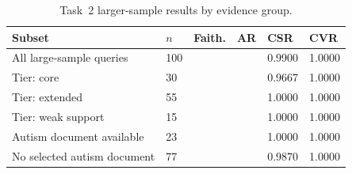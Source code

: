 \begin{table}
\centering
\small
\caption{Task~2 larger-sample results by evidence group.}
\label{tab:task2-group-robustness}
\setlength{\tabcolsep}{2pt}
\renewcommand{\arraystretch}{1.08}
\begin{tabular}{P{3.4cm} Q{0.7cm} Q{2.4cm} Q{2.4cm} Q{1.0cm} Q{1.0cm}}
\toprule
\textbf{Subset} & \textbf{$n$} & \textbf{Faith.} & \textbf{AR} & \textbf{CSR} & \textbf{CVR} \\
\midrule
All large-sample queries & 100 &  &  & 0.9900 & 1.0000 \\
Tier: core & 30 &  &  & 0.9667 & 1.0000 \\
Tier: extended & 55 &  &  & 1.0000 & 1.0000 \\
Tier: weak support & 15 &  &  & 1.0000 & 1.0000 \\
Autism document available & 23 &  &  & 1.0000 & 1.0000 \\
No selected autism document & 77 &  &  & 0.9870 & 1.0000 \\
\bottomrule
\end{tabular}
\end{table}
